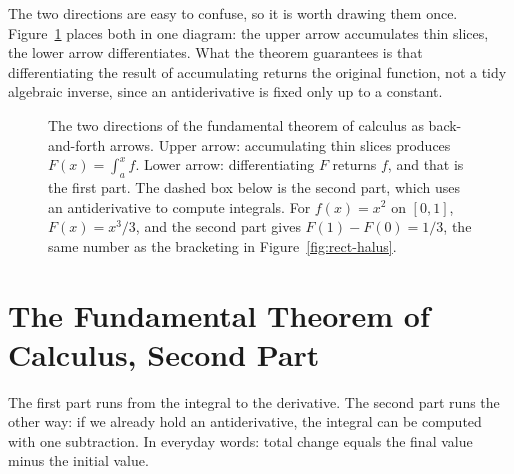 The two directions are easy to confuse, so it is worth drawing them once.
Figure~\ref{fig:tdk-dua-arah} places both in one diagram: the upper arrow
accumulates thin slices, the lower arrow differentiates. What the theorem guarantees is that
differentiating the result of accumulating returns the original function, not a tidy algebraic inverse,
since an antiderivative is fixed only up to a constant.

\begin{figure}[htbp]
\centering
{}
\caption{The two directions of the fundamental theorem of calculus as back-and-forth arrows. Upper arrow:
accumulating thin slices produces $F(x)=\int_a^x f$. Lower arrow: differentiating $F$
returns $f$, and that is the first part. The dashed box below is the second
part, which uses an antiderivative to compute integrals. For $f(x)=x^2$ on
$[0,1]$, $F(x)=x^3/3$, and the second part gives $F(1)-F(0)=1/3$, the same number as
the bracketing in Figure~\ref{fig:rect-halus}.}
\label{fig:tdk-dua-arah}
\end{figure}

\section{The Fundamental Theorem of Calculus, Second Part}

The first part runs from the integral to the derivative. The second part runs the other way:
if we already hold an antiderivative, the integral can be computed with one subtraction.
In everyday words: total change equals the final value minus the initial value.

